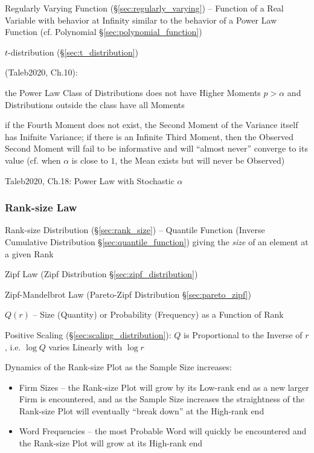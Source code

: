 \fist Regularly Varying Function (\S\ref{sec:regularly_varying}) -- Function of
a Real Variable with behavior at Infinity similar to the behavior of a Power Law
Function (cf. Polynomial \S\ref{sec:polynomial_function})

$t$-distribution (\S\ref{sec:t_distribution})

(Taleb2020, Ch.10):

the Power Law Class of Distributions does not have Higher Moments $p > \alpha$
and Distributions outside the class have all Moments

if the Fourth Moment does not exist, the Second Moment of the Variance itself
has Inifnite Variance; if there is an Infinite Third Moment, then the Observed
Second Moment will fail to be informative and will ``almost never'' converge to
its value (cf. when $\alpha$ is close to $1$, the Mean exists but will never be
Observed)

Taleb2020, Ch.18: Power Law with Stochastic $\alpha$



\subsubsection{Rank-size Law}\label{sec:ranksize_law}

Rank-size Distribution (\S\ref{sec:rank_size}) -- Quantile Function (Inverse
Cumulative Distribution \S\ref{sec:quantile_function}) giving the \emph{size} of
an element at a given Rank

Zipf Law (Zipf Distribution \S\ref{sec:zipf_distribution})

Zipf-Mandelbrot Law (Pareto-Zipf Distribution \S\ref{sec:pareto_zipf})

$Q(r)$ -- Size (Quantity) or Probability (Frequency) as a Function of Rank

Positive Scaling (\S\ref{sec:scaling_distribution}): $Q$ is Proportional to the
Inverse of $r$, i.e. $\log Q$ varies Linearly with $\log r$

Dynamics of the Rank-size Plot as the Sample Size increases:
\begin{itemize}
  \item Firm Sizes -- the Rank-size Plot will grow by its Low-rank end as a new
    larger Firm is encountered, and as the Sample Size increases the
    straightness of the Rank-size Plot will eventually ``break down'' at the
    High-rank end
  \item Word Frequencies -- the most Probable Word will quickly be encountered
    and the Rank-size Plot will grow at its High-rank end
\end{itemize}



